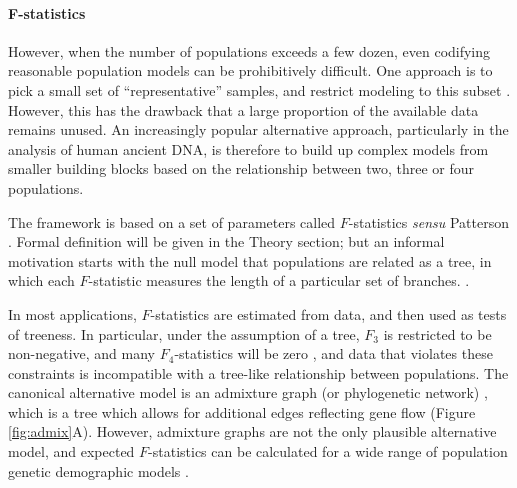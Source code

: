 \documentclass[12pt,fullpage, a4paper]{article}
\begin{document}
\paragraph{F-statistics}
However, when the number of populations exceeds a few dozen,  even codifying reasonable population models can be prohibitively difficult. One approach is to pick a small set of ``representative'' samples, and restrict modeling to this subset \citep[e.g.][]{gravel2011, harney2021}. However, this has the drawback that a large proportion of the available data remains unused. An increasingly popular alternative approach, particularly in the analysis of human ancient DNA, is therefore to build up complex models from smaller building blocks based on the relationship between two, three or four populations.

The framework is based on a set of parameters called  $F$-statistics \textit{sensu} Patterson \citep{reich2009, patterson2012, peter2016}. Formal definition will be given in the Theory section; but an informal motivation starts with the null model that populations are related as a tree, in which each $F$-statistic measures the length of a particular set of branches. \citep[Figure \ref{fig:geom};][]{semple2003, peter2016}.

In most applications, $F$-statistics are estimated from  data, and then used as tests of treeness. In particular, under the assumption of a tree, $F_3$ is restricted to be non-negative, and many $F_4$-statistics will be zero \citep{semple2003, patterson2012}, and data that violates these constraints is incompatible with a tree-like relationship between populations. The canonical alternative model is an admixture graph (or phylogenetic network) \citep{patterson2012, huson2010}, which is a tree which allows for additional edges reflecting gene flow (Figure \ref{fig:admix}A). However, admixture graphs are not the only plausible alternative model, and expected $F$-statistics can be calculated for a wide range of population genetic demographic models \citep{peter2016}.
\end{document}
